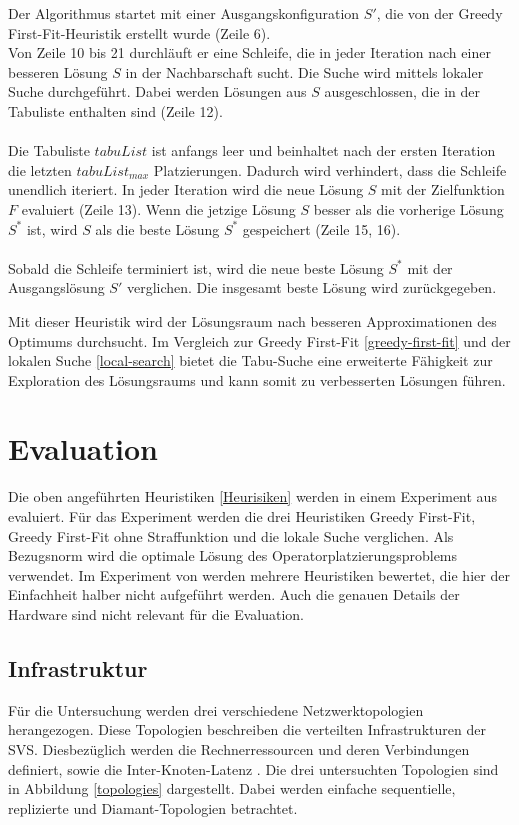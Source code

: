 \documentclass{article}
\begin{document}
Der Algorithmus startet mit einer Ausgangskonfiguration $S'$, die von der Greedy First-Fit-Heuristik erstellt wurde (Zeile 6). \\ 
Von Zeile 10 bis 21 durchläuft er eine Schleife, die in jeder Iteration nach einer besseren Lösung $S$ in der Nachbarschaft sucht. 
Die Suche wird mittels lokaler Suche durchgeführt. Dabei werden Lösungen aus $S$ ausgeschlossen, die in der Tabuliste enthalten sind (Zeile 12). \\ \\
Die Tabuliste $tabuList$ ist anfangs leer und beinhaltet nach der ersten Iteration die letzten $tabuList_{max}$ Platzierungen. 
Dadurch wird verhindert, dass die Schleife unendlich iteriert.
In jeder Iteration wird die neue Lösung $S$ mit der Zielfunktion $F$ evaluiert (Zeile 13). %
Wenn die jetzige Lösung $S$ besser als die vorherige Lösung $S^*$ ist, wird $S$ als die beste Lösung $S^*$ gespeichert (Zeile 15, 16). \\ \\
Sobald die Schleife terminiert ist, wird die neue beste Lösung $S^*$ mit der Ausgangslösung $S'$ verglichen. Die insgesamt beste Lösung wird zurückgegeben. 



Mit dieser Heuristik wird der Lösungsraum nach besseren Approximationen des Optimums durchsucht. 
Im Vergleich zur Greedy First-Fit \ref{greedy-first-fit} und der 
lokalen Suche \ref{local-search} bietet die Tabu-Suche eine erweiterte Fähigkeit zur Exploration 
des Lösungsraums und kann somit zu verbesserten Lösungen führen.


\section{Evaluation}
Die oben angeführten Heuristiken \ref{Heurisiken} werden in einem Experiment aus \cite{efficient-operator-placement} evaluiert. 
Für das Experiment werden die drei Heuristiken Greedy First-Fit, Greedy First-Fit ohne Straffunktion und die lokale Suche verglichen. 
Als Bezugsnorm wird die optimale Lösung des Operatorplatzierungsproblems verwendet. 
Im Experiment von \cite{efficient-operator-placement} werden mehrere Heuristiken bewertet, die hier der Einfachheit halber nicht aufgeführt werden. 
Auch die genauen Details der Hardware sind nicht relevant für die Evaluation.


\subsection{Infrastruktur}
Für die Untersuchung werden drei verschiedene Netzwerktopologien herangezogen. 
Diese Topologien beschreiben die verteilten Infrastrukturen der SVS. 
Diesbezüglich werden die Rechnerressourcen und deren Verbindungen definiert, sowie die Inter-Knoten-Latenz \cite{efficient-operator-placement}. 
Die drei untersuchten Topologien sind in Abbildung \ref{topologies} dargestellt. Dabei werden einfache sequentielle, replizierte und Diamant-Topologien betrachtet. \\
\end{document}
